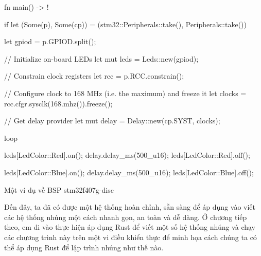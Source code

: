 \clearpage
\begin{listing}[ht]
\begin{rustcode}
fn main() -> ! {
    if let (Some(p), Some(cp)) = (stm32::Peripherals::take(), Peripherals::take()) {
        let gpiod = p.GPIOD.split();

        // Initialize on-board LEDs
        let mut leds = Leds::new(gpiod);

        // Constrain clock registers
        let rcc = p.RCC.constrain();

        // Configure clock to 168 MHz (i.e. the maximum) and freeze it
        let clocks = rcc.cfgr.sysclk(168.mhz()).freeze();

        // Get delay provider
        let mut delay = Delay::new(cp.SYST, clocks);

        loop {
            leds[LedColor::Red].on();
            delay.delay_ms(500_u16);
            leds[LedColor::Red].off();

            leds[LedColor::Blue].on();
            delay.delay_ms(500_u16);
            leds[LedColor::Blue].off();
        }
    }
}
\end{rustcode}
\caption{Một ví dụ về BSP stm32f407g-disc}
\label{code:rust_stm32f407g}
\end{listing}

\bigskip
Đến đây, ta đã có được một hệ thống hoàn chỉnh, sẵn sàng để áp dụng vào viết các hệ thống nhúng một cách nhanh gọn, an toàn và dễ dàng.
Ở chương tiếp theo, em đi vào thực hiện áp dụng Rust để viết một số hệ thống nhúng và chạy các chương trình này trên một vi điều khiển thực để minh họa cách chúng ta có thể áp dụng Rust để lập trình nhúng như thế nào.
